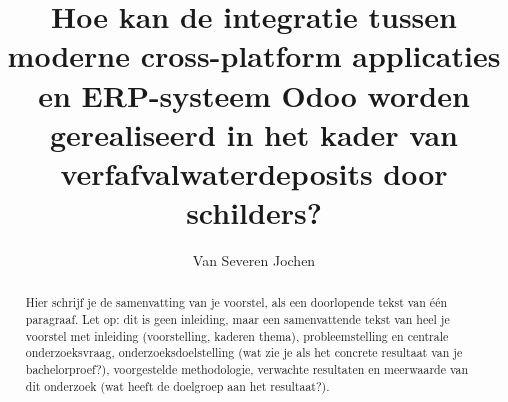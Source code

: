 \documentclass{hogent-article}
\title{Hoe kan de integratie tussen moderne cross-platform applicaties en ERP-systeem Odoo worden gerealiseerd in het kader van verfafvalwaterdeposits door schilders?}
\author{Van Severen Jochen}
\begin{document}
\begin{abstract}
  Hier schrijf je de samenvatting van je voorstel, als een doorlopende tekst van één paragraaf. 
  Let op: dit is geen inleiding, maar een samenvattende tekst van heel je voorstel met inleiding (voorstelling, kaderen thema), probleemstelling en centrale onderzoeksvraag, onderzoeksdoelstelling (wat zie je als het concrete resultaat van je bachelorproef?), voorgestelde methodologie, verwachte resultaten en meerwaarde van dit onderzoek (wat heeft de doelgroep aan het resultaat?).
\end{abstract}

\tableofcontents



\printbibliography[heading=bibintoc]
\end{document}
